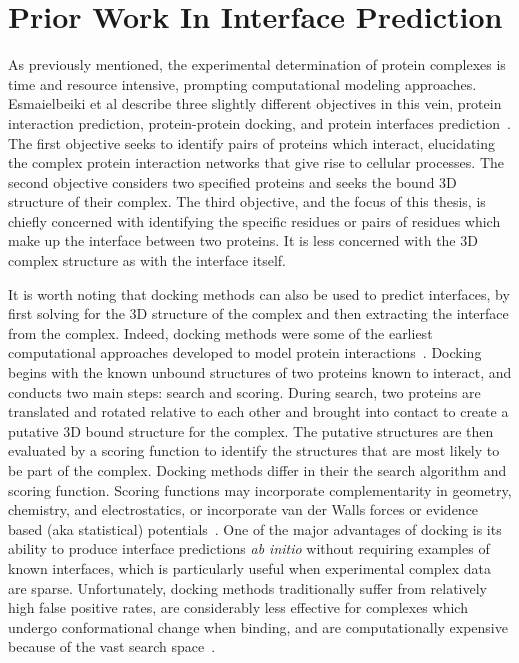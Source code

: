 
\chapter{Prior Work In Interface Prediction}
\label{chap:relatedwork} 


As previously mentioned, the experimental determination of protein complexes is time and resource intensive, prompting computational modeling approaches.
Esmaielbeiki et al describe three slightly different objectives in this vein, protein interaction prediction, protein-protein docking, and protein interfaces prediction~\cite{esmaielbeiki2015}.
The first objective seeks to identify pairs of proteins which interact, elucidating the complex protein interaction networks that give rise to cellular processes. 
The second objective considers two specified proteins and seeks the bound 3D structure of their complex.
The third objective, and the focus of this thesis, is chiefly concerned with identifying the specific residues or pairs of residues which make up the interface between two proteins.
It is less concerned with the 3D complex structure as with the interface itself.

It is worth noting that docking methods can also be used to predict interfaces, by first solving for the 3D structure of the complex and then extracting the interface from the complex.
Indeed, docking methods were some of the earliest computational approaches developed to model protein interactions~\cite{janin1995}.
Docking begins with the known unbound structures of two proteins known to interact, and conducts two main steps: search and scoring.
During search, two proteins are translated and rotated relative to each other and brought into contact to create a putative 3D bound structure for the complex.
The putative structures are then evaluated by a scoring function to identify the structures that are most likely to be part of the complex.
Docking methods differ in their the search algorithm and scoring function.
Scoring functions may incorporate complementarity in geometry, chemistry, and electrostatics, or incorporate van der Walls forces or evidence based (aka statistical) potentials~\cite{tuncbag2011}\cite{janin1995}.
One of the major advantages of docking is its ability to produce interface predictions \textit{ab initio} without requiring examples of known interfaces, which is particularly useful when experimental complex data are sparse.
Unfortunately, docking methods traditionally suffer from relatively high false positive rates, are considerably less effective for complexes which undergo conformational change when binding, and are computationally expensive because of the vast search space~\cite{janin1995}\cite{tuncbag2011}.

